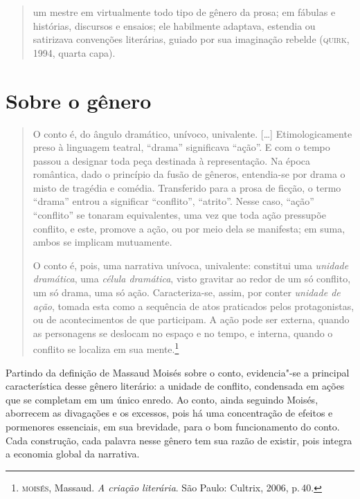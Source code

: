 \begin{quote}
um mestre em virtualmente todo
tipo de gênero da prosa; em fábulas e histórias, discursos e ensaios; ele
habilmente adaptava, estendia ou satirizava convenções literárias, guiado
por sua imaginação rebelde (\textsc{quirk}, 1994, quarta capa). 
\end{quote}


\section{Sobre o gênero}

\begin{quote}
O conto é, do ângulo dramático, unívoco, univalente. [\ldots]
Etimologicamente preso à linguagem teatral,
``drama'' significava ``ação''. E com o tempo passou a designar
toda peça destinada à representação. Na época romântica, dado o
princípio da fusão de gêneros, entendia-se por drama o misto de
tragédia e comédia. Transferido para a prosa de ficção, o termo
``drama'' entrou a significar ``conflito'', ``atrito''. Nesse caso,
``ação'' ``conflito'' se tonaram equivalentes, uma vez que toda
ação pressupõe conflito, e este, promove a ação, ou por meio dela
se manifesta; em suma, ambos se implicam mutuamente.

O conto é, pois, uma narrativa unívoca, univalente: constitui
uma \textit{unidade dramática}, uma \textit{célula dramática}, visto gravitar ao
redor de um só conflito, um só drama, uma só ação. Caracteriza-se,
assim, por conter \textit{unidade de ação}, tomada esta como a sequência de atos praticados pelos protagonistas, ou de acontecimentos de
que participam. A ação pode ser externa, quando as personagens se
deslocam no espaço e no tempo, e interna, quando o conflito se
localiza em sua mente.\footnote{\textsc{moisés}, Massaud. \textit{A criação literária}. São Paulo: Cultrix, 2006, p.\,40.}
\end{quote}

Partindo da definição de Massaud Moisés sobre o conto, evidencia"-se a principal característica desse gênero literário: a unidade de conflito, condensada em ações que se completam em um único enredo. Ao conto, ainda seguindo Moisés, aborrecem as divagações e os excessos, pois há uma concentração de efeitos e pormenores essenciais, em sua brevidade, para o bom funcionamento do conto.
Cada construção, cada palavra nesse gênero tem sua razão de existir, pois integra a economia global da narrativa.

